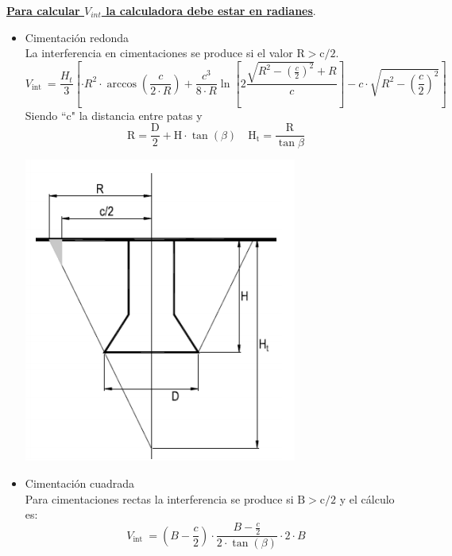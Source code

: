 \documentclass{article}
\begin{document}
\begin{itemize}
                \underline{\textbf{Para calcular $V_{int}$ la calculadora debe estar en radianes}}.
                \begin{itemize}
                        \item Cimentación redonda
                         \\
                         La interferencia en cimentaciones se produce si el valor $\mathrm{R}>\mathrm{c} / 2$.
                        $$
                        V_{\text {int }}=\frac{H_{t}}{3}\left[ \cdot R^{2} \cdot \arccos{ \left(\frac{c}{2 \cdot R}\right)}+\frac{c^{3}}{8 \cdot R} \ln \left[2 \frac{\sqrt{R^{2}-\left(\frac{c}{2}\right)^{2}}+R}{c}\right]-c \cdot \sqrt{R^{2}-\left(\frac{c}{2}\right)^{2}}\right]
                        $$
                        Siendo ``c" la distancia entre patas y
                        $$
                        \mathrm{R}=\frac{\mathrm{D}}{2}+\mathrm{H} \cdot \tan (\beta) \quad \mathrm{H}_{\mathrm{t}}=\frac{\mathrm{R}}{\tan \beta}
                        $$
                        \begin{center}
                            \includegraphics[scale = 0.4]{assets/img/Patas Separadas/interferencia redonda.png}
                        \end{center}
                        \item Cimentación cuadrada
                        \\
                         Para cimentaciones rectas la interferencia se produce si $\mathrm{B}>\mathrm{c} / 2$ y el cálculo es:
$$
V_{\text {int }}=\left(B-\frac{c}{2}\right) \cdot \frac{B-\frac{c}{2}}{2 \cdot \tan (\beta)} \cdot 2 \cdot B
$$
\end{itemize}
\end{itemize}
\end{document}

